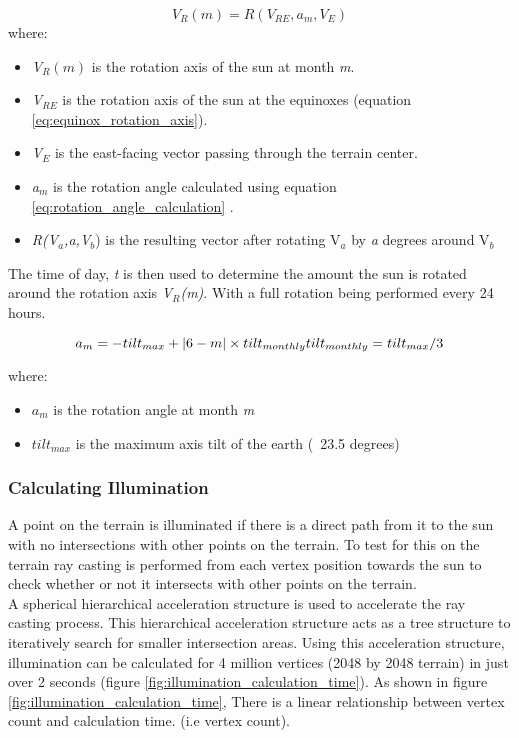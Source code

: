 \begin{equation} \label{eq:all_month_rotation_axis}
	V_{R}(m) = R(V_{RE}, a_{m}, V_{E})
\end{equation}
where:
\begin{itemize}
\item \textit{V$_{R}(m)$} is the rotation axis of the sun at month \textit{m}.\\
\item \textit{V$_{RE}$} is the rotation axis of the sun at the equinoxes (equation \ref{eq:equinox_rotation_axis}).\\
\item \textit{V$_{E}$} is the east-facing vector passing through the terrain center.\\
\item \textit{a$_{m}$} is the rotation angle calculated using equation \ref{eq:rotation_angle_calculation} .\\
\item \textit{R(V$_{a}$,\textit{a},V$_{b}$}) is the resulting vector after rotating V$_{a}$ by \textit{a} degrees around V$_{b}$\\
\end{itemize}

The time of day, \textit{t} is then used to determine the amount the sun is rotated around the rotation axis \textit{V$_{R}$(m)}. With a full rotation being performed every 24 hours.

\begin{equation} \label{eq:rotation_angle_calculation}
	a_{m} = -tilt_{max} + |6-m| \times tilt_{monthly} $$\\
$$
tilt_{monthly} = tilt_{max}/3
\end{equation}

where:
\begin{itemize}
\item \textit{$a_{m}$} is the rotation angle at month \textit{m}
\item \textit{$tilt_{max}$} is the maximum axis tilt of the earth (~23.5 degrees)
\end{itemize}

\subsubsection{Calculating Illumination}

A point on the terrain is illuminated if there is a direct path from it to the sun with no intersections with other points on the terrain. To test for this on the terrain ray casting is performed from each vertex position towards the sun to check whether or not it intersects with other points on the terrain.\\
A spherical hierarchical acceleration structure is used to accelerate the ray casting process. This hierarchical acceleration structure acts as a tree structure to iteratively search for smaller intersection areas. Using this acceleration structure, illumination can be calculated for 4 million vertices (2048 by 2048 terrain) in just over 2 seconds (figure \ref{fig:illumination_calculation_time}). As shown in figure \ref{fig:illumination_calculation_time}, There is a linear relationship between vertex count and calculation time. (i.e vertex count).


